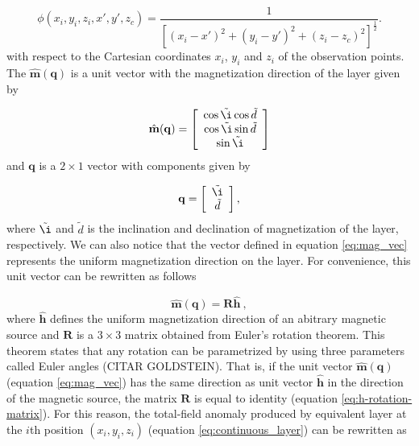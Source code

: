 \begin{equation}
\phi (x_i,y_i,z_i,x',y',z_c) = \frac{1}{[(x_i-x')^2 + (y_i-y')^2 + (z_i-z_c)^2]^{\frac{1}{2}}} .
\label{eq:phi}
\end{equation}
with respect to the Cartesian coordinates $x_i$, $y_i$ and $z_i$ of the observation points. The $\hat{\mathbf{m}}(\mathbf{q})$ is a unit vector with the magnetization direction of the layer given by 

\begin{equation}
	\hat{\mathbf{m}}(\mathbf{q}) =
	\left[ \begin{array}{c}
		\cos \tilde{\i} \cos \tilde{d} \\
		\cos \tilde{\i} \sin \tilde{d}\\
		\sin \tilde{\i}
	\end{array} \right] 
	\label{eq:mag_vec}
\end{equation}
and $\mathbf{q}$ is a $2 \times 1$ vector with components given by 

\begin{equation}
	\mathbf{q} =
	\left[ \begin{array}{c}
		\tilde{\i} \\ 
		\tilde{d} 
	\end{array} \right] ,
	\label{eq:q_vector}
\end{equation}
where $\tilde{\i} $ and $\tilde{d} $ is the inclination and declination of magnetization of the layer, respectively. We can also notice that the vector defined in equation \ref{eq:mag_vec} represents the uniform magnetization direction on the layer. For convenience, this unit vector can be rewritten as follows

\begin{equation}
\hat{\mathbf{m}}(\mathbf{q}) = \mathbf{R}\hat{\mathbf{h}} \: ,
\label{eq:h-rotation-matrix}
\end{equation}
where $\hat{\mathbf{h}}$ defines the uniform magnetization direction of an abitrary magnetic source and $\mathbf{R}$ is a $3 \times 3$ matrix obtained from Euler's rotation theorem. This theorem states that any rotation can be parametrized by using three parameters called Euler angles (CITAR GOLDSTEIN). That is, if the unit vector $\hat{\mathbf{m}}(\mathbf{q})$ (equation \ref{eq:mag_vec}) has the same direction as unit vector  $\hat{\mathbf{h}}$ in the direction of the magnetic source, the matrix $\mathbf{R}$ is equal to identity (equation \ref{eq:h-rotation-matrix}). For this reason, the total-field anomaly produced by equivalent layer at the $i$th position $(x_i,y_i,z_i)$ (equation \ref{eq:continuous_layer}) can be rewritten as 

